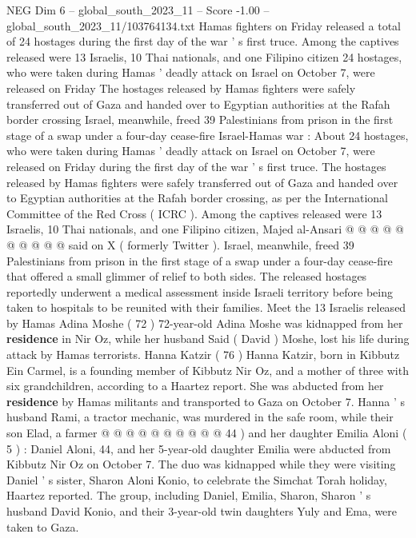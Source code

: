 \begin{textsample}{NEG Dim 6 – global\_south\_2023\_11 – Score -1.00 – global\_south\_2023\_11/103764134.txt}  \label{ex:f6_neg_148}
Hamas fighters on Friday released a total of 24 hostages during the first day of the war ' s first truce.
Among the captives released were 13 Israelis, 10 Thai nationals, and one Filipino citizen 24 hostages, who were taken during Hamas ' deadly attack on Israel on October 7, were released on Friday The hostages released by Hamas fighters were safely transferred out of Gaza and handed over to Egyptian authorities at the Rafah border crossing Israel, meanwhile, freed 39 Palestinians from prison in the first stage of a swap under a four-day cease-fire Israel-Hamas war : About 24 hostages, who were taken during Hamas ' deadly attack on Israel on October 7, were released on Friday during the first day of the war ' s first truce.
The hostages released by Hamas fighters were safely transferred out of Gaza and handed over to Egyptian authorities at the Rafah border crossing, as per the International Committee of the Red Cross ( ICRC ).
Among the captives released were 13 Israelis, 10 Thai nationals, and one Filipino citizen, Majed al-Ansari @ @ @ @ @ @ @ @ @ @ said on X ( formerly Twitter ).
Israel, meanwhile, freed 39 Palestinians from prison in the first stage of a swap under a four-day cease-fire that offered a small glimmer of relief to both sides.
The released hostages reportedly underwent a medical assessment inside Israeli territory before being taken to hospitals to be reunited with their families.
Meet the 13 Israelis released by Hamas Adina Moshe ( 72 ) 72-year-old Adina Moshe was kidnapped from her \textbf{residence} in Nir Oz, while her husband Said ( David ) Moshe, lost his life during attack by Hamas terrorists.
Hanna Katzir ( 76 ) Hanna Katzir, born in Kibbutz Ein Carmel, is a founding member of Kibbutz Nir Oz, and a mother of three with six grandchildren, according to a Haartez report.
She was abducted from her \textbf{residence} by Hamas militants and transported to Gaza on October 7.
Hanna ' s husband Rami, a tractor mechanic, was murdered in the safe room, while their son Elad, a farmer @ @ @ @ @ @ @ @ @ @ 44 ) and her daughter Emilia Aloni ( 5 ) : Daniel Aloni, 44, and her 5-year-old daughter Emilia were abducted from Kibbutz Nir Oz on October 7.
The duo was kidnapped while they were visiting Daniel ' s sister, Sharon Aloni Konio, to celebrate the Simchat Torah holiday, Haartez reported.
The group, including Daniel, Emilia, Sharon, Sharon ' s husband David Konio, and their 3-year-old twin daughters Yuly and Ema, were taken to Gaza.

\end{textsample}
